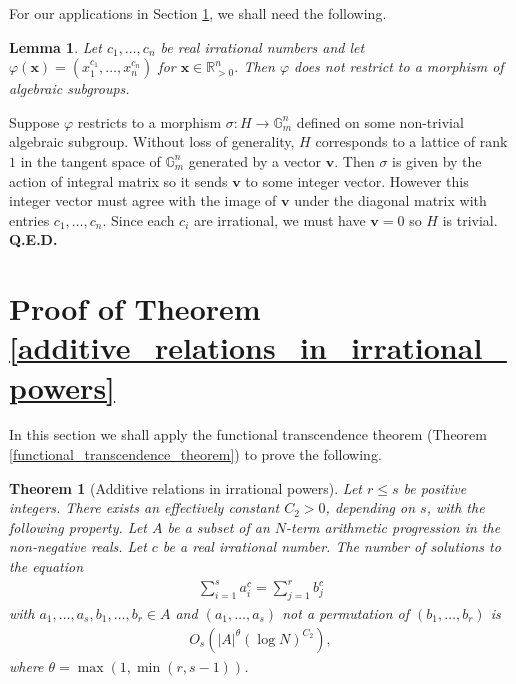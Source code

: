 \documentclass[9pt]{amsart}
\theoremstyle{my_theorem_style}
\numberwithin{definition}{section}
\newtheorem{theorem}[definition]{Theorem}
\newtheorem{lemma}[definition]{Lemma}
\renewenvironment{proof}{\noindent {\textbf{Proof.}}}{\\\textbf{Q.E.D.}}
\newcommand{\G}{\mathbb{G}}
\renewcommand{\phi}{\varphi}
\newcommand{\R}{\mathbb{R}}
\renewcommand{\vec}[1]{\bm{#1}}
\begin{document}
For our applications in Section \ref{proof_of_theorem_B}, we shall need the following.

\begin{lemma}
\label{lemma/raising_to_irrational_powers_not_a_morhpism_of_algebraic_subgroups}
    Let $c_1, \dots, c_n$ be real irrational numbers and let $\phi(\vec{x}) = (x_1^{c_1}, \dots, x_n^{c_n})$ for $\vec{x} \in \R_{>0}^n$. Then $\phi$ does not restrict to a morphism of algebraic subgroups.
\end{lemma}
\begin{proof}
    Suppose $\phi$ restricts to a morphism $\sigma : H \to \G_m^n$ defined on some non-trivial algebraic subgroup. Without loss of generality, $H$ corresponds to a lattice of rank $1$ in the tangent space of $\G_m^n$ generated by a vector $\vec{v}$. Then $\sigma$ is given by the action of integral matrix so it sends $\vec{v}$ to some integer vector. However this integer vector must agree with the image of $\vec{v}$ under the diagonal matrix with entries $c_1, \dots, c_n$. Since each $c_i$ are irrational, we must have $\vec{v} = 0$ so $H$ is trivial.
\end{proof}

\section{Proof of Theorem \ref{additive_relations_in_irrational_powers}}
\label{proof_of_theorem_B}

In this section we shall apply the functional transcendence theorem (Theorem \ref{functional_transcendence_theorem}) to prove the following.

\begin{theorem}
[Additive relations in irrational powers]
    Let $r \leq s$ be positive integers. There exists an effectively constant $C_2 > 0$, depending on $s$, with the following property. Let $A$ be a subset of an $N$-term arithmetic progression in the non-negative reals. Let $c$ be a real irrational number. The number of solutions to the equation
    \begin{align}
    \label{additive_relations_in_irrational_powers_equation_proof}
        \sum_{i = 1}^s a_i^c = \sum_{j = 1}^r b_j^c
    \end{align}
    with $a_1, \dots, a_s, b_1, \dots, b_r \in A$ and $(a_1, \dots, a_s)$ not a permutation of $(b_1, \dots, b_r)$ is
    \begin{align*}
        O_s\left(
        |A|^{\theta}(\log N)^{C_2}
        \right),
    \end{align*}
    where $\theta = \max(1, \min(r, s - 1))$.
\end{theorem}
\end{document}
